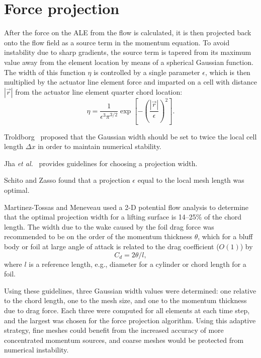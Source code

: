 \section{Force projection}

After the force on the ALE from the flow is calculated, it is then projected
back onto the flow field as a source term in the momentum equation. To avoid
instability due to sharp gradients, the source term is tapered from its maximum
value away from the element location by means of a spherical Gaussian function.
The width of this function $\eta$ is controlled by a single parameter
$\epsilon$, which is then multiplied by the actuator line element force and
imparted on a cell with distance $| \vec{r} |$ from the actuator line element
quarter chord location:
\begin{equation}
    \eta = \frac{1}{\epsilon^3 \pi^{3/2}} \exp 
    \left[ - \left( \frac{| \vec{r} |}{\epsilon} \right)^2 \right].
    \label{eq:projection}
\end{equation}

Troldborg~\cite{Troldborg2008} proposed that the Gaussian width should be set to
twice the local cell length $\Delta x$ in order to maintain numerical stability.

Jha \emph{et al.}~\cite{Jha2014} provides guidelines for choosing a projection
width.

Schito and Zasso \cite{Schito2014} found that a projection $\epsilon$ equal to
the local mesh length was optimal.

Martinez-Tossas and Meneveau \cite{Martinez-Tossas2015b} used a 2-D potential
flow analysis to determine that the optimal projection width for a lifting
surface is 14--25\% of the chord length. The width due to the wake caused by the
foil drag force was recommended to be on the order of the momentum thickness
$\theta$, which for a bluff body or foil at large angle of attack is related to
the drag coefficient ($O(1)$) by \cite{TennekesAndLumley}
\begin{equation}
    C_d = 2 \theta / l,
    \label{eq:mom-thickness}
\end{equation}
where $l$ is a reference length, e.g., diameter for a cylinder or chord length
for a foil.

Using these guidelines, three Gaussian width values were determined: one
relative to the chord length, one to the mesh size, and one to the momentum
thickness due to drag force. Each three were computed for all elements at each
time step, and the largest was chosen for the force projection algorithm. Using
this adaptive strategy, fine meshes could benefit from the increased accuracy of
more concentrated momentum sources, and coarse meshes would be protected from
numerical instability.

